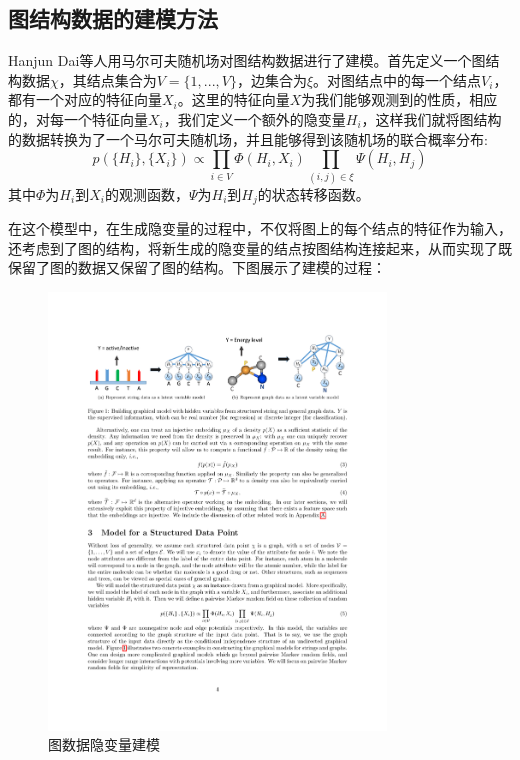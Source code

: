 \subsection{图结构数据的建模方法}
Hanjun Dai\cite{dai2016discriminative}等人用马尔可夫随机场对图结构数据进行了建模。首先定义一个图结构数据$\chi$，其结点集合为$\mathit{V}=\{1,...,V\}$，边集合为$\xi$。对图结点中的每一个结点$V_i$，都有一个对应的特征向量$X_i$。这里的特征向量$X$为我们能够观测到的性质，相应的，对每一个特征向量$X_i$，我们定义一个额外的隐变量$H_i$，这样我们就将图结构的数据转换为了一个马尔可夫随机场，并且能够得到该随机场的联合概率分布:
\begin{equation*}
p(\{H_i\}, \{X_i\}) \propto \prod_{i\in V} \Phi(H_i, X_i)\prod_{(i, j)\in \xi} \Psi(H_i, H_j)
\end{equation*}
其中$\Phi$为$H_i$到$X_i$的观测函数，$\Psi$为$H_i$到$H_j$的状态转移函数。
\par 在这个模型中，在生成隐变量的过程中，不仅将图上的每个结点的特征作为输入，还考虑到了图的结构，将新生成的隐变量的结点按图结构连接起来，从而实现了既保留了图的数据又保留了图的结构。下图展示了建模的过程：
\begin{figure}[htbp]
\begin{center}
\includegraphics[width=0.8\textwidth]{figures//1.pdf}
\caption{图数据隐变量建模}
\label{default}
\end{center}
\end{figure}
